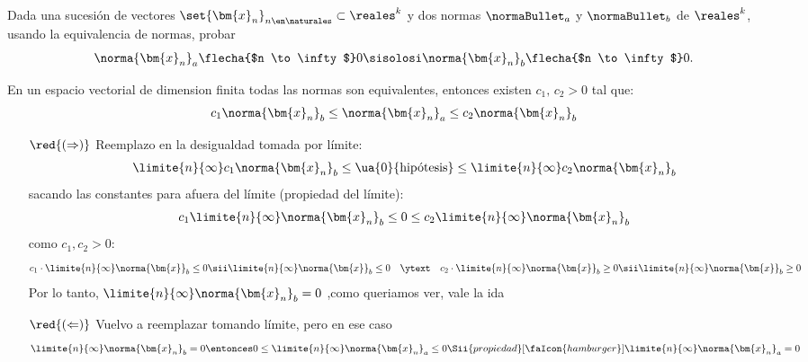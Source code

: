 \begin{enunciado}{\ejercicio}
  Dada una sucesión de vectores $\set{\bm{x}_n}_{n \en \naturales} \subset \reales^k$ y dos normas $\normaBullet_a$ y $\normaBullet_b$ de
  $\reales^k$, usando la equivalencia de normas, probar
  $$
    \norma{\bm{x}_n}_a \flecha{$n \to \infty$} 0
    \sisolosi
    \norma{\bm{x}_n}_b \flecha{$n \to \infty$} 0.
  $$
\end{enunciado}

\medskip

En un espacio vectorial de dimension finita todas las normas son equivalentes, entonces existen $c_1,\, c_2 > 0$ tal que:
$$
  c_1 \norma{\bm{x}_n}_b
  \leq
  \norma{\bm{x}_n}_a
  \leq
  c_2 \norma{\bm{x}_n}_b
$$

\begin{enumerate}
  \item[$\red{(\Rightarrow)}$]
        Reemplazo en la desigualdad tomada por límite:
        $$
          \limite{n}{\infty} c_1\norma{\bm{x}_n}_b \leq \ua{0}{\text{hipótesis}}
          \leq
          \limite{n}{\infty}  c_2\norma{\bm{x}_n}_b
        $$
        sacando las constantes para afuera del límite (propiedad del límite):
        $$
          c_1 \limite{n}{\infty} \norma{\bm{x}_n}_b \leq 0 \leq  c_2 \limite{n}{\infty} \norma{\bm{x}_n}_b
        $$
        como  $c_1, c_2 > 0$:
        $$
          c_1 \cdot \limite{n}{\infty} \norma{\bm{x}}_b \leq 0
          \sii
          \limite{n}{\infty} \norma{\bm{x}}_b \leq 0
          \quad \ytext \quad
          c_2 \cdot \limite{n}{\infty} \norma{\bm{x}}_b \geq 0
          \sii
          \limite{n}{\infty} \norma{\bm{x}}_b \geq  0
        $$
        Por lo tanto, $\limite{n}{\infty} \norma{\bm{x}_n}_b = 0$ ,como queriamos ver, vale la ida

  \item[$\red{(\Leftarrow)}$]
        Vuelvo a reemplazar tomando límite, pero en ese caso
        $$
          \limite{n}{\infty} \norma{\bm{x}_n}_b = 0
          \entonces
          0 \leq \limite{n}{\infty} \norma{\bm{x}_n}_a \leq 0
          \Sii{propiedad}[\faIcon{hamburger}]
          \limite{n}{\infty} \norma{\bm{x}_n}_a = 0
        $$

\end{enumerate}

\begin{aportes}
  \item {}
  \item {}
\end{aportes}
